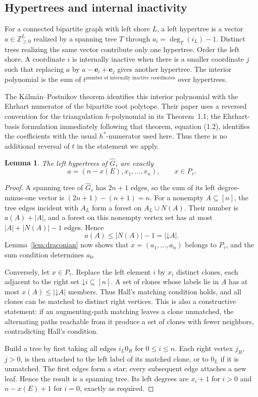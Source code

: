 \documentclass[11pt]{article}
\numberwithin{equation}{section}
\newtheorem{lemma}[theorem]{Lemma}
\theoremstyle{definition}
\newcommand{\N}{\mathbb Z_{\geq0}}
\newcommand{\ee}{\mathbf e}
\newcommand{\down}{\mathord\downarrow}
\begin{document}
\subsection{Hypertrees and internal inactivity}

For a connected bipartite graph with left shore $L$, a left hypertree is a
vector $a\in\N^L$ realized by a spanning tree $T$ through
$a_i=\deg_T(i_L)-1$. Distinct trees realizing the same vector contribute only
one hypertree. Order the left shore. A coordinate $i$ is internally inactive
when there is a smaller coordinate $j$ such that replacing $a$ by
$a-\ee_i+\ee_j$ gives another hypertree. The interior polynomial is the sum
of $t^{\text{number of internally inactive coordinates}}$ over hypertrees.

The K\'alm\'an--Postnikov theorem identifies this interior polynomial with the
Ehrhart numerator of the bipartite root polytope. Their paper uses a reversed
convention for the triangulation $h$-polynomial in its Theorem~1.1; the
Ehrhart-basis formulation immediately following that theorem, equation (1.2),
identifies the coefficients with the usual $h^*$-numerator used here. Thus
there is no additional reversal of $t$ in the statement we apply.

\begin{lemma}\label{lem:hypertrees}
The left hypertrees of $\widehat G_\tau$ are exactly
\begin{equation}
 a=(n-x(E),x_1,\ldots,x_n),\qquad x\in P_\tau.\label{eq:hypertree}
\end{equation}
\end{lemma}
\begin{proof}
A spanning tree of $\widehat G_\tau$ has $2n+1$ edges, so the sum of its left
degree-minus-one vector is $(2n+1)-(n+1)=n$. For a nonempty
$A\subseteq[n]$, the tree edges incident with $A_L$ form a forest on
$A_L\cup N(A)$. Their number is $a(A)+|A|$, and a forest on this nonempty
vertex set has at most $|A|+|N(A)|-1$ edges. Hence
\[
 a(A)\leq |N(A)|-1=|\down A|.
\]
Lemma~\ref{lem:draconian} now shows that $x=(a_1,\ldots,a_n)$ belongs to
$P_\tau$, and the sum condition determines $a_0$.

Conversely, let $x\in P_\tau$. Replace the left element $i$ by $x_i$ distinct
clones, each adjacent to the right set $\down i\subseteq[n]$. A set of clones
whose labels lie in $A$ has at most $x(A)\leq|\down A|$ members. Thus Hall's
matching condition holds, and all clones can be matched to distinct right
vertices. This is also a constructive statement: if an augmenting-path
matching leaves a clone unmatched, the alternating paths reachable from it
produce a set of clones with fewer neighbors, contradicting Hall's condition.

Build a tree by first taking all edges $i_L0_R$ for $0\leq i\leq n$. Each
right vertex $j_R$, $j>0$, is then attached to the left label of its matched
clone, or to $0_L$ if it is unmatched. The first edges form a star; every
subsequent edge attaches a new leaf. Hence the result is a spanning tree.
Its left degrees are $x_i+1$ for $i>0$ and $n-x(E)+1$ for $i=0$, exactly
as required.
\end{proof}
\end{document}
